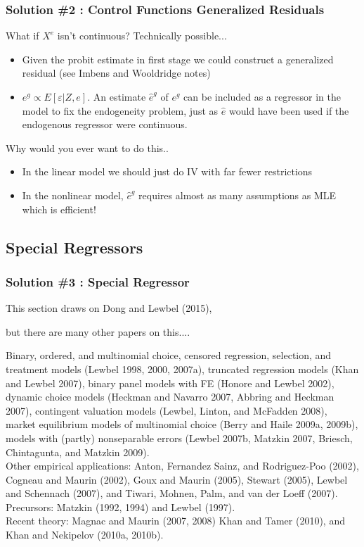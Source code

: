 \documentclass[11pt,dvipsnames,table,aspectratio=169]{beamer}
\begin{document}
\begin{frame}
\frametitle{Solution \#2 : Control Functions Generalized Residuals}
What if $X^e$ isn't continuous? Technically possible...
\begin{itemize}
\item Given the probit estimate in first stage we could construct a generalized residual (see Imbens and Wooldridge notes) 
\item $e^g \propto E[\varepsilon | Z, e]$. An estimate $\hat{e}^g$ of $e^g$ can be included as a regressor in the model to fix the endogeneity problem, just as $\hat{e}$ would have been used if the endogenous regressor were continuous.
\end{itemize}
Why would you ever want to do this..
\begin{itemize}
\item In the linear model we should just do IV with far fewer restrictions
\item In the nonlinear model, $\hat{e}^g$ requires almost as many assumptions as MLE which is efficient!
\end{itemize}
\end{frame}

\subsection{Special Regressors}
\begin{frame}
\frametitle{Solution \#3 : Special Regressor}
This section draws on Dong and Lewbel (2015), 
\pause

but there are many other papers on this.... 

\small
Binary, ordered, and multinomial choice, censored regression, selection, and treatment models (Lewbel 1998, 2000, 2007a), truncated regression models (Khan and Lewbel 2007), binary panel models with FE (Honore and Lewbel 2002), dynamic choice models (Heckman and Navarro 2007, Abbring and Heckman 2007), contingent valuation models (Lewbel, Linton, and McFadden 2008), market equilibrium models of multinomial choice (Berry and Haile 2009a, 2009b), models with (partly) nonseparable errors (Lewbel 2007b, Matzkin 2007, Briesch, Chintagunta, and Matzkin 2009).\\
Other empirical applications: Anton, Fernandez Sainz, and Rodriguez-Poo (2002), Cogneau and Maurin (2002), Goux and Maurin (2005), Stewart (2005), Lewbel and Schennach (2007), and Tiwari, Mohnen, Palm, and van der Loeff (2007).\\
Precursors: Matzkin (1992, 1994) and Lewbel (1997).\\
Recent theory: Magnac and Maurin (2007, 2008) Khan and Tamer (2010), and Khan and Nekipelov (2010a, 2010b).
\end{frame}
\end{document}
